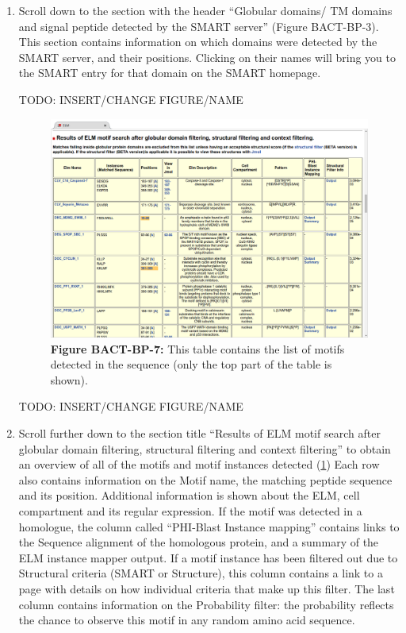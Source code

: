 \begin{enumerate}
\item Scroll down to the section with the header ``Globular domains/ TM domains
	and signal peptide detected by the SMART server'' (Figure BACT-BP-3).
	This section contains information on which domains were detected by the
	SMART server, and their positions. Clicking on their names will bring
	you to the SMART entry for that domain on the SMART homepage.

TODO: INSERT/CHANGE FIGURE/NAME

\begin{figure}[h!]
	\centering
	\includegraphics[width=\textwidth]{Figures/predicting_p53/elm_results_motifs.png}
	\caption{
	\textbf{Figure BACT-BP-7:} This table contains the list of motifs
	detected in the sequence (only the top part of the table is shown).
	}
	\label{fig:predicting_p53_elm_results_motifs}
\end{figure}

TODO: INSERT/CHANGE FIGURE/NAME

\item Scroll further down to the section title ``Results of ELM motif search
	after globular domain filtering, structural filtering and context
	filtering'' to obtain an overview of all of the motifs and motif
	instances detected
	(\ref{fig:predicting_p53_elm_results_motifs})
	Each row also contains
	information on the Motif name, the matching peptide sequence and its
	position. Additional information is shown about the ELM, cell
	compartment and its regular expression. If the motif was detected in a
	homologue, the column called ``PHI-Blast Instance mapping'' contains
	links to the Sequence alignment of the homologous protein, and a
	summary of the ELM instance mapper output. If a motif instance has been
	filtered out due to Structural criteria (SMART or Structure), this
	column contains a link to a page with details on how individual
	criteria that make up this filter. The last column contains information
	on the Probability filter: the probability reflects the chance to
	observe this motif in any random amino acid sequence.  


\end{enumerate}
